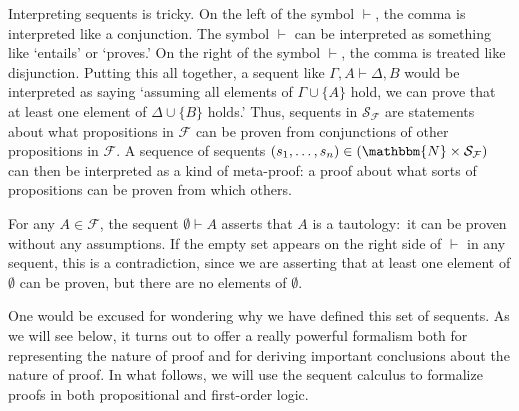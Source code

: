 \documentclass[11pt]{article}
\theoremstyle{definition}
\theoremstyle{remark}
\begin{document}
Interpreting sequents is tricky. On the left of the symbol $\vdash$, the comma is interpreted like a conjunction. The symbol $\vdash$ can be interpreted as something like `entails' or `proves.' On the right of the symbol $\vdash$, the comma is treated like disjunction. Putting this all together, a sequent like $\Gamma,A\vdash\Delta,B$ would be interpreted as saying `assuming all elements of $\Gamma\cup\{A\}$ hold, we can prove that at least one element of $\Delta\cup\{B\}$ holds.' Thus, sequents in $\mathcal{S}_{\mathcal{F}}$ are statements about what propositions in $\mathcal{F}$ can be proven from conjunctions of other propositions in $\mathcal{F}$. A sequence of sequents $(s_{1},\dots,s_{n})\in (\mathbbm{N}\times\mathcal{S}_{\mathcal{F}})$ can then be interpreted as a kind of meta-proof: a proof about what sorts of propositions can be proven from which others.\par

For any $A\in\mathcal{F}$, the sequent $\emptyset\vdash A$ asserts that $A$ is a tautology:\ it can be proven without any assumptions. If the empty set appears on the right side of $\vdash$ in any sequent, this is a contradiction, since we are asserting that at least one element of $\emptyset$ can be proven, but there are no elements of $\emptyset$.\par 

One would be excused for wondering why we have defined this set of sequents. As we will see below, it turns out to offer a really powerful formalism both for representing the nature of proof and for deriving important conclusions about the nature of proof. In what follows, we will use the sequent calculus to formalize proofs in both propositional and first-order logic.\par  
\end{document}
